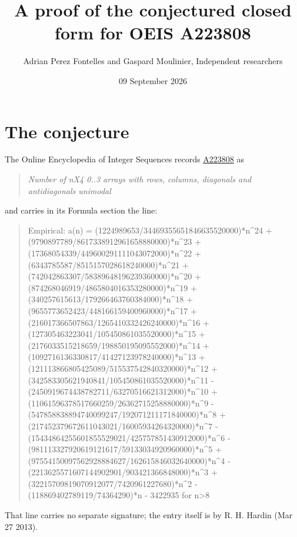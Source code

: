 \documentclass[11pt]{article}
\title{A proof of the conjectured closed form for OEIS A223808}
\author{Adrian Perez Fontelles and Gaspard Moulinier, Independent researchers}
\date{09 September 2026}
\theoremstyle{definition}
\begin{document}
\maketitle
\section{The conjecture}

The Online Encyclopedia of Integer Sequences records \href{https://oeis.org/A223808}{A223808} as

\begin{quote}\itshape Number of nX4 0..3 arrays with rows, columns, diagonals and antidiagonals unimodal\end{quote}

and carries in its Formula section the line:

\begin{quote}\ttfamily Empirical: a(n) = (1224989653/34469355651846635520000)*n\textasciicircum{}24 + (9790897789/8617338912961658880000)*n\textasciicircum{}23 + (17368054339/449600291111043072000)*n\textasciicircum{}22 + (6343785587/8515157028618240000)*n\textasciicircum{}21 + (742042863307/58389648196239360000)*n\textasciicircum{}20 + (874268046919/4865804016353280000)*n\textasciicircum{}19 + (340257615613/179266463760384000)*n\textasciicircum{}18 + (9655773652423/448166159400960000)*n\textasciicircum{}17 + (216017366507863/1265410332426240000)*n\textasciicircum{}16 + (127305463223041/105450861035520000)*n\textasciicircum{}15 + (2176033515218659/198850195095552000)*n\textasciicircum{}14 + (1092716136330817/41427123978240000)*n\textasciicircum{}13 + (121113866805425089/515537542840320000)*n\textasciicircum{}12 + (342583305621940841/105450861035520000)*n\textasciicircum{}11 - (2450919674438782711/63270516621312000)*n\textasciicircum{}10 + (11061596378517660259/26362715258880000)*n\textasciicircum{}9 - (547858838894740099247/192071211171840000)*n\textasciicircum{}8 + (217452379672611043021/16005934264320000)*n\textasciicircum{}7 - (15434864255601855529021/425757851430912000)*n\textasciicircum{}6 - (981113327920619121617/59133034920960000)*n\textasciicircum{}5 + (97554150097562928884627/162615846032640000)*n\textasciicircum{}4 - (2213625571607144902901/903421366848000)*n\textasciicircum{}3 + (32215709819070912077/7420961227680)*n\textasciicircum{}2 - (118869402789119/74364290)*n - 3422935 for n>8\end{quote}

That line carries no separate signature; the entry itself is by R. H. Hardin (Mar 27 2013).
\end{document}
